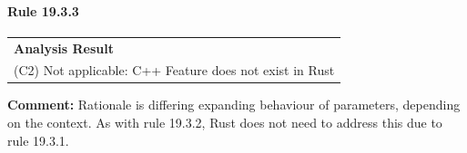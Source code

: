 \paragraph{Rule 19.3.3}
\begin{longtable}{p{13cm}}
\textbf{Analysis Result} \\
(C2) Not applicable: C++ Feature does not exist in Rust \\
\end{longtable}
\textbf{Comment:} Rationale is differing expanding behaviour of parameters, depending on the context. As with rule 19.3.2, Rust does not need to address this due to rule 19.3.1. \\
